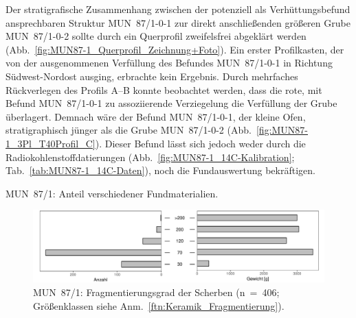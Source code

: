 Der stratigrafische Zusammenhang zwischen der potenziell als Verhüttungsbefund ansprechbaren Struktur MUN~87/1-0-1 zur direkt anschließenden größeren Grube MUN~87/1-0-2 sollte durch ein Querprofil zweifelsfrei abgeklärt werden (Abb.~\ref{fig:MUN87-1_Querprofil_Zeichnung+Foto}). Ein erster Profilkasten, der von der ausgenommenen Verfüllung des Befundes MUN~87/1-0-1 in Richtung Südwest-Nordost ausging, erbrachte kein Ergebnis. Durch mehrfaches Rückverlegen des Profils A--B konnte beobachtet werden, dass die rote, mit Befund MUN~87/1-0-1 zu assoziierende Verziegelung die Verfüllung der Grube überlagert. Demnach wäre der Befund MUN~87/1-0-1, der kleine Ofen, stratigraphisch jünger als die Grube MUN~87/1-0-2 (Abb.~\ref{fig:MUN87-1_3Pl_T40Profil_C}). Dieser Befund lässt sich jedoch weder durch die Radiokohlenstoffdatierungen (Abb.~\ref{fig:MUN87-1_14C-Kalibration}; Tab.~\ref{tab:MUN87-1_14C-Daten}), noch die Fundauswertung bekräftigen.

\begin{table}[tb]
	\centering{\footnotesize
		 }
	\caption{MUN~87/1: Anteil verschiedener Fundmaterialien.}
	\label{tab:MUN87-1_Funde}
\end{table}

\begin{figure}[tb]
	\centering
	\includegraphics[width=\textwidth]{fig/9-12_MUN87-1_Fragmentierung_2.pdf}
	\caption{MUN~87/1: Fragmentierungsgrad der Scherben (n~=~406; Größenklassen siehe Anm.~\ref{ftn:Keramik_Fragmentierung}).}
	\label{fig:MUN87-1_Fragmentierung}
\end{figure}

